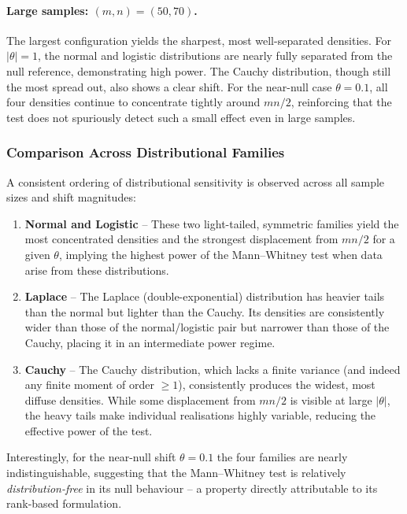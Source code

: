 \documentclass[10pt]{article}
\begin{document}
\paragraph{Large samples: $(m,n)=(50,70)$.}
The largest configuration yields the sharpest, most well-separated densities.  For
$|\theta|=1$, the normal and logistic distributions are nearly fully separated from
the null reference, demonstrating high power.  The Cauchy distribution, though
still the most spread out, also shows a clear shift.  For the near-null case
$\theta=0.1$, all four densities continue to concentrate tightly around $mn/2$,
reinforcing that the test does not spuriously detect such a small effect even in
large samples.

\subsubsection*{Comparison Across Distributional Families}

A consistent ordering of distributional sensitivity is observed across all
sample sizes and shift magnitudes:

\begin{enumerate}
  \item \textbf{Normal and Logistic} -- These two light-tailed, symmetric families
        yield the most concentrated densities and the strongest displacement from
        $mn/2$ for a given $\theta$, implying the highest power of the Mann--Whitney
        test when data arise from these distributions.
  \item \textbf{Laplace} -- The Laplace (double-exponential) distribution has
        heavier tails than the normal but lighter than the Cauchy.  Its densities
        are consistently wider than those of the normal/logistic pair but narrower
        than those of the Cauchy, placing it in an intermediate power regime.
  \item \textbf{Cauchy} -- The Cauchy distribution, which lacks a finite variance
        (and indeed any finite moment of order $\geq 1$), consistently produces the
        widest, most diffuse densities.  While some displacement from $mn/2$ is
        visible at large $|\theta|$, the heavy tails make individual realisations
        highly variable, reducing the effective power of the test.
\end{enumerate}

Interestingly, for the near-null shift $\theta=0.1$ the four families are nearly
indistinguishable, suggesting that the Mann--Whitney test is relatively
\emph{distribution-free} in its null behaviour -- a property directly attributable
to its rank-based formulation.
\end{document}
